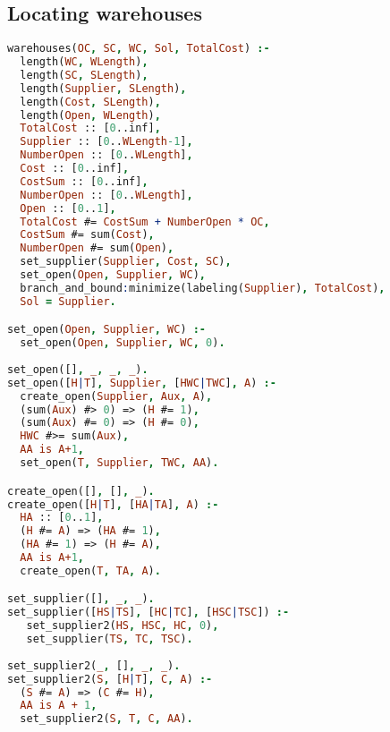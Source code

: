 \subsection{Locating warehouses}
\begin{lstlisting}[language=Prolog]
warehouses(OC, SC, WC, Sol, TotalCost) :-
  length(WC, WLength),
  length(SC, SLength),
  length(Supplier, SLength),
  length(Cost, SLength),
  length(Open, WLength),
  TotalCost :: [0..inf],
  Supplier :: [0..WLength-1],
  NumberOpen :: [0..WLength],
  Cost :: [0..inf],
  CostSum :: [0..inf],
  NumberOpen :: [0..WLength],
  Open :: [0..1],
  TotalCost #= CostSum + NumberOpen * OC,
  CostSum #= sum(Cost),
  NumberOpen #= sum(Open),
  set_supplier(Supplier, Cost, SC),
  set_open(Open, Supplier, WC),
  branch_and_bound:minimize(labeling(Supplier), TotalCost),
  Sol = Supplier.

set_open(Open, Supplier, WC) :-
  set_open(Open, Supplier, WC, 0).
  
set_open([], _, _, _).
set_open([H|T], Supplier, [HWC|TWC], A) :-
  create_open(Supplier, Aux, A),
  (sum(Aux) #> 0) => (H #= 1),
  (sum(Aux) #= 0) => (H #= 0),
  HWC #>= sum(Aux),
  AA is A+1,
  set_open(T, Supplier, TWC, AA).

create_open([], [], _).
create_open([H|T], [HA|TA], A) :-
  HA :: [0..1],
  (H #= A) => (HA #= 1), 
  (HA #= 1) => (H #= A),
  AA is A+1,
  create_open(T, TA, A).

set_supplier([], _, _).
set_supplier([HS|TS], [HC|TC], [HSC|TSC]) :-
   set_supplier2(HS, HSC, HC, 0),
   set_supplier(TS, TC, TSC).
   
set_supplier2(_, [], _, _).
set_supplier2(S, [H|T], C, A) :-
  (S #= A) => (C #= H),
  AA is A + 1,
  set_supplier2(S, T, C, AA).
\end{lstlisting}